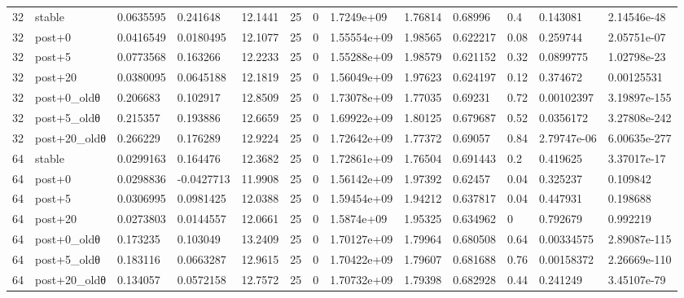 \begin{tabular}{lllllllllllll}
32 & stable & 0.0635595 & 0.241648 & 12.1441 & 25 & 0 & 1.7249e+09 & 1.76814 & 0.68996 & 0.4 & 0.143081 & 2.14546e-48 \\
32 & post+0 & 0.0416549 & 0.0180495 & 12.1077 & 25 & 0 & 1.55554e+09 & 1.98565 & 0.622217 & 0.08 & 0.259744 & 2.05751e-07 \\
32 & post+5 & 0.0773568 & 0.163266 & 12.2233 & 25 & 0 & 1.55288e+09 & 1.98579 & 0.621152 & 0.32 & 0.0899775 & 1.02798e-23 \\
32 & post+20 & 0.0380095 & 0.0645188 & 12.1819 & 25 & 0 & 1.56049e+09 & 1.97623 & 0.624197 & 0.12 & 0.374672 & 0.00125531 \\
32 & post+0\_oldθ & 0.206683 & 0.102917 & 12.8509 & 25 & 0 & 1.73078e+09 & 1.77035 & 0.69231 & 0.72 & 0.00102397 & 3.19897e-155 \\
32 & post+5\_oldθ & 0.215357 & 0.193886 & 12.6659 & 25 & 0 & 1.69922e+09 & 1.80125 & 0.679687 & 0.52 & 0.0356172 & 3.27808e-242 \\
32 & post+20\_oldθ & 0.266229 & 0.176289 & 12.9224 & 25 & 0 & 1.72642e+09 & 1.77372 & 0.69057 & 0.84 & 2.79747e-06 & 6.00635e-277 \\
64 & stable & 0.0299163 & 0.164476 & 12.3682 & 25 & 0 & 1.72861e+09 & 1.76504 & 0.691443 & 0.2 & 0.419625 & 3.37017e-17 \\
64 & post+0 & 0.0298836 & -0.0427713 & 11.9908 & 25 & 0 & 1.56142e+09 & 1.97392 & 0.62457 & 0.04 & 0.325237 & 0.109842 \\
64 & post+5 & 0.0306995 & 0.0981425 & 12.0388 & 25 & 0 & 1.59454e+09 & 1.94212 & 0.637817 & 0.04 & 0.447931 & 0.198688 \\
64 & post+20 & 0.0273803 & 0.0144557 & 12.0661 & 25 & 0 & 1.5874e+09 & 1.95325 & 0.634962 & 0 & 0.792679 & 0.992219 \\
64 & post+0\_oldθ & 0.173235 & 0.103049 & 13.2409 & 25 & 0 & 1.70127e+09 & 1.79964 & 0.680508 & 0.64 & 0.00334575 & 2.89087e-115 \\
64 & post+5\_oldθ & 0.183116 & 0.0663287 & 12.9615 & 25 & 0 & 1.70422e+09 & 1.79607 & 0.681688 & 0.76 & 0.00158372 & 2.26669e-110 \\
64 & post+20\_oldθ & 0.134057 & 0.0572158 & 12.7572 & 25 & 0 & 1.70732e+09 & 1.79398 & 0.682928 & 0.44 & 0.241249 & 3.45107e-79 \\
\hline
\end{tabular}

